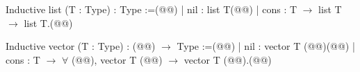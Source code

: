 Inductive list (T : Type) : Type :=(@\vspace{-0.04cm}@)
| nil : list T(@\vspace{-0.04cm}@)
| cons : T $\rightarrow$ list T $\rightarrow$ list T.(@\vspace{-0.04cm}@)

Inductive vector (T : Type) : (@@) $\rightarrow$ Type :=(@\vspace{-0.04cm}@)
| nil : vector T (@@)(@\vspace{-0.04cm}@)
| cons : T $\rightarrow$ $\forall$ (@@), vector T (@@) $\rightarrow$ vector T (@@).(@\vspace{-0.04cm}@)
